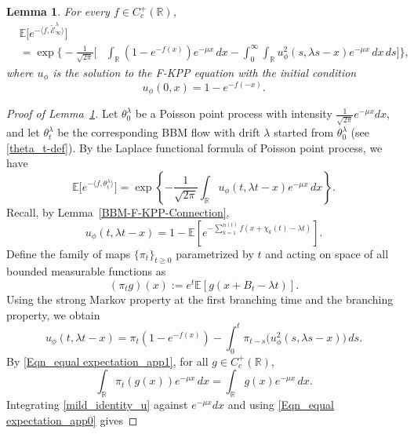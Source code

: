 \documentclass[a4paper,reqno]{amsart}%
\newcommand{\1}{\mathbf 1}
\theoremstyle{mine}
\numberwithin{theorem}{section}
\newtheorem{lemma}[theorem]{Lemma}
\numberwithin{equation}{section}
\theoremstyle{remark}
\begin{document}
   \begin{lemma}\label{lemma:laplace_supercritical} For every $f\in C_c^+(\mathbb R)$, \begin{equation}\label{laplace_supercritical} \begin{aligned} &\mathbb E\big[ e^{-\langle f,\widetilde{\mathcal E}^{\lambda}_{\infty}\rangle} \big]\\
   &= \exp\Bigg\{ -\frac{1}{\sqrt{2\pi}}\Bigg[ &\int_{\mathbb R}(1-e^{-f(x)})e^{-\mu x}\,dx - \int_0^\infty\int_{\mathbb R} u_{\phi}^2(s,\lambda s-x)e^{-\mu x}\,dx\,ds \Bigg] \Bigg\}, \end{aligned} \end{equation} where $u_{\phi}$ is the solution to the F-KPP equation with the initial condition \[ u_{\phi}(0,x)=1-e^{-f(-x)}. \] \end{lemma}
   \begin{proof}[Proof of Lemma~\ref{lemma:laplace_supercritical}]
   Let $\theta_0^\lambda$ be a Poisson point process with intensity $\frac{1}{\sqrt{2\pi}}e^{-\mu x}dx$, and let $\theta_t^\lambda$ be the corresponding BBM flow with drift $\lambda$ started from $\theta_0^\lambda$ (see \eqref{theta_t-def}). 
   By the Laplace functional formula of Poisson point process,
   we have
   \[ \mathbb E\big[e^{-\langle f,\theta_t^\lambda\rangle}\big] = \exp\left\{ -\frac{1}{\sqrt{2\pi}}\int_{\mathbb R} u_{\phi}(t,\lambda t-x)e^{-\mu x}\,dx \right\}. \] 
   Recall, by Lemma~\ref{BBM-F-KPP-Connection}, 
   \[ u_{\phi}(t,\lambda t-x) = 1-\mathbb{E}[e^{-\sum_{k=1}^{n(t)} f(x + \chi_k(t) -\lambda t )}].\]
Define the family of maps $\{\pi_t\}_{t \ge 0}$ parametrized by $t$ and acting on space of all bounded measurable functions as
   \begin{equation}
       (\pi_t g)(x):= e^t\mathbb E[g(x+B_t-\lambda t)].  
   \end{equation}
   Using the strong Markov property at the first branching time and the branching property, we obtain
   \begin{equation}
   \label{mild_identity_u} u_{\phi}(t,\lambda t-x) = \pi_t(1-e^{-f(x)}) - \int_0^t \pi_{t-s} \big(u_{\phi}^2(s,\lambda s-x)\big)\,ds . 
   \end{equation}
    By \eqref{Eqn_equal expectation_app1}, for all $g \in C_c^+(\mathbb R),$
    \begin{equation}\label{Eqn_equal expectation_app0}
    \int_{\mathbb R}\pi_t( g(x))e^{-\mu x}\,dx = \int_{\mathbb R}g(x)e^{-\mu x}\,dx.
    \end{equation}
   Integrating \eqref{mild_identity_u} against $e^{-\mu x}dx$ and using \eqref{Eqn_equal expectation_app0} gives 

\end{proof}
\end{document}
